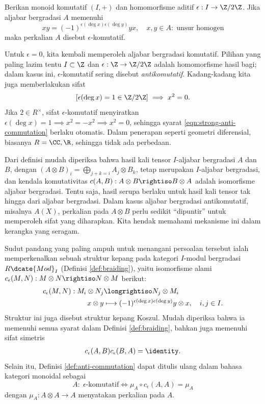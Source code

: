 \begin{definition}\label{def:anti-commutation}
	Berikan monoid komutatif $(I, +)$ dan homomorfisme aditif $\epsilon: I \to \Z/2\Z$. Jika aljabar bergradasi $A$ memenuhi
	\[ xy = (-1)^{\epsilon(\deg x) \epsilon(\deg y)} yx, \quad x, y \in A: \;\text{unsur homogen} \]
	maka perkalian $A$ disebut $\epsilon$-komutatif.
\end{definition}
Untuk $\epsilon=0$, kita kembali memperoleh aljabar bergradasi komutatif. Pilihan yang paling lazim tentu $I \subset \Z$ dan $\epsilon: \Z \to \Z/2\Z$ adalah homomorfisme hasil bagi; dalam kasus ini, $\epsilon$-komutatif sering disebut \emph{antikomutatif}. Kadang-kadang kita juga memberlakukan sifat
\begin{gather}\label{eqn:strong-anti-commutation}
	\left[ \epsilon(\deg x) = 1 \in \Z/2\Z \right] \implies x^2 = 0.
\end{gather}
Jika $2 \in R^\times$, sifat $\epsilon$-komutatif menyiratkan $\epsilon(\deg x)=1 \implies x^2 = -x^2 \implies x^2=0$, sehingga syarat \eqref{eqn:strong-anti-commutation} berlaku otomatis. Dalam penerapan seperti geometri diferensial, biasanya $R = \CC, \R$, sehingga tidak ada perbedaan.

Dari definisi mudah diperiksa bahwa hasil kali tensor $I$-aljabar bergradasi $A$ dan $B$, dengan $(A \otimes B)_i = \bigoplus_{j+k=i} A_j \otimes B_k$, tetap merupakan $I$-aljabar bergradasi, dan kendala komutativitas $c(A,B): A \otimes B \rightiso B \otimes A$ adalah isomorfisme aljabar bergradasi. Tentu saja, hasil serupa berlaku untuk hasil kali tensor tak hingga dari aljabar bergradasi. Dalam kasus aljabar bergradasi antikomutatif, misalnya $A(X)$, perkalian pada $A \otimes B$ perlu sedikit ``dipuntir'' untuk memperoleh sifat yang diharapkan. Kita hendak memahami mekanisme ini dalam kerangka yang seragam.

Sudut pandang yang paling ampuh untuk menangani persoalan tersebut ialah memperkenalkan sebuah struktur kepang pada kategori $I$-modul bergradasi $R\dcate{Mod}_I$ (Definisi \ref{def:braiding}), yaitu isomorfisme alami $c_\epsilon(M, N): M \otimes N \rightiso N \otimes M$ berikut:
\begin{align*}
	c_\epsilon(M,N): M_i \otimes N_j & \longrightiso N_j \otimes M_i \\
	x \otimes y & \longmapsto (-1)^{\epsilon(\deg x)\epsilon(\deg y)} y \otimes x, \quad i,j \in I.
\end{align*}
Struktur ini juga disebut struktur kepang Koszul. Mudah diperiksa bahwa ia memenuhi semua syarat dalam Definisi \ref{def:braiding}, bahkan juga memenuhi sifat simetris
\begin{gather}\label{eqn:Koszul-braiding-symm}
	c_\epsilon(A,B) c_\epsilon(B, A) = \identity.
\end{gather}
Selain itu, Definisi \ref{def:anti-commutation} dapat ditulis ulang dalam bahasa kategori monoidal sebagai
\[ A:\; \epsilon\text{-komutatif} \iff \mu_A \circ c_\epsilon(A,A) = \mu_A \]
dengan $\mu_A: A \otimes A \to A$ menyatakan perkalian pada $A$.

